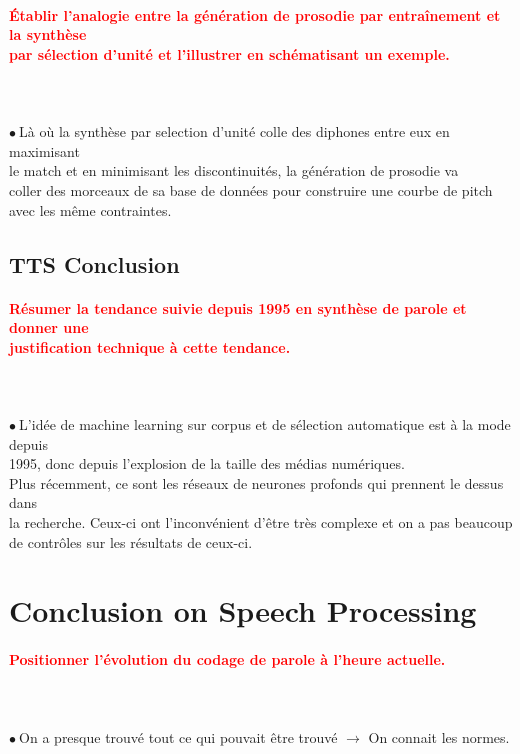\documentclass[letterpaper, 12pt]{article}
\newcommand{\alinea}{
\hspace*{0.3cm}}
\newcommand{\red}[1]{
	\textcolor{red}{#1}
}
\newcommand{\point}{$\bullet\ $}
\begin{document}
		\paragraph{\red{Établir l'analogie entre la génération de prosodie par entraînement et la synthèse 
		~\\ \hspace*{0.035cm} par sélection d'unité et l'illustrer en schématisant un exemple.}}~\\~\\
			\point Là où la synthèse par selection d'unité colle des diphones entre eux en maximisant
				\\\alinea le match et en minimisant les discontinuités, la génération de prosodie va
				\\\alinea coller des morceaux de sa base de données pour construire une courbe de pitch
				\\\alinea avec les même contraintes.
	\subsection{TTS Conclusion}
		\paragraph{\red{Résumer la tendance suivie depuis 1995 en synthèse de parole et donner une 
		~\\ \hspace*{0.035cm} justification technique à cette tendance.}}~\\~\\
			\point L'idée de machine learning sur corpus et de sélection automatique est à la mode depuis
				\\\alinea 1995, donc depuis l'explosion de la taille des médias numériques.
				\\\alinea Plus récemment, ce sont les réseaux de neurones profonds qui prennent le dessus dans 
				\\\alinea la recherche. Ceux-ci ont l'inconvénient d'être très complexe et on a pas beaucoup
				\\\alinea de contrôles sur les résultats de ceux-ci.
\pagebreak
\section{Conclusion on Speech Processing}
		\paragraph{\red{ Positionner l'évolution du codage de parole à l'heure actuelle.}}~\\~\\
			\point On a presque trouvé tout ce qui pouvait être trouvé $\rightarrow$ On connait les normes.
\end{document}
